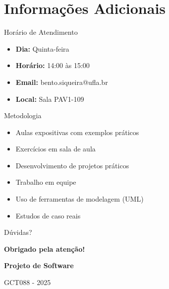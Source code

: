 \documentclass[aspectratio=169]{beamer}
\begin{document}
\section{Informações Adicionais}

\begin{frame}{Horário de Atendimento}
\begin{itemize}
    \item \textbf{Dia:} Quinta-feira
    \item \textbf{Horário:} 14:00 às 15:00
    \item \textbf{Email:} bento.siqueira@ufla.br
    \item \textbf{Local:} Sala PAV1-109
\end{itemize}
\end{frame}

\begin{frame}{Metodologia}
\begin{itemize}
    \item Aulas expositivas com exemplos práticos
    \item Exercícios em sala de aula
    \item Desenvolvimento de projetos práticos
    \item Trabalho em equipe
    \item Uso de ferramentas de modelagem (UML)
    \item Estudos de caso reais
\end{itemize}
\end{frame}

\begin{frame}{Dúvidas?}
\begin{center}
\Large
\textbf{Obrigado pela atenção!}

\vspace{1cm}
\textbf{Projeto de Software}

\vspace{0.5cm}
GCT088 - 2025
\end{center}
\end{frame}
\end{document}
